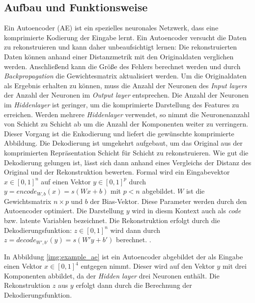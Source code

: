\subsection{Aufbau und Funktionsweise}

Ein Autoencoder (AE) ist ein spezielles neuronales Netzwerk, dass eine komprimierte Kodierung der Eingabe lernt. Ein Autoencoder versucht die Daten zu rekonstruieren und kann daher unbeaufsichtigt lernen: Die rekonstruierten Daten können anhand einer Distanzmetrik mit den Originaldaten verglichen werden. Anschließend kann die Größe des Fehlers berechnet werden und durch \textit{Backpropagation} die Gewichtesmatrix aktualisiert werden.
Um die Originaldaten als Ergebnis erhalten zu können, muss die Anzahl der Neuronen des \textit{Input layers} der Anzahl der Neuronen im \textit{Output layer} entsprechen. Die Anzahl der Neuronen im \textit{Hiddenlayer} ist geringer, um die komprimierte Darstellung des Features zu erreichen. Werden mehrere \textit{Hiddenlayer} verwendet, so nimmt die Neuronenanzahl von Schicht zu Schicht ab um die Anzahl der Komponenten weiter zu verringern. Dieser Vorgang ist die Enkodierung und liefert die gewünschte komprimierte Abbildung. Die Dekodierung ist umgekehrt aufgebaut, um das Original aus der komprimierten Repräsentation Schicht für Schicht zu rekonstruieren. Wie gut die Dekodierung gelungen ist, lässt sich dann anhand eines Vergleichs der Distanz des Original und der Rekonstruktion bewerten. Formal wird ein Eingabevektor $x \in [0,1]^n$ auf einen Vektor $y \in [0,1]^p$ durch $y = encode_{W,b}(x) = s(Wx + b)$  mit $p < n$ abgebildet. $W$ ist die Gewichtsmatrix $n \times p$ und $b$ der Bias-Vektor. Diese Parameter werden durch den Autoencoder optimiert. Die Darstellung $y$ wird in diesm Kontext auch als \textit{code} bzw. latente Variablen bezeichnet. Die Rekonstruktion erfolgt durch die Dekodierungsfunktion: $z \in [0, 1]^n$ wird dann durch $z = decode_{W', b'}(y) = s(W'y + b')$ berechnet. \cite{ssn1997}.

In Abbildung \ref{img:example_ae} ist ein Autoencoder abgebildet der als Eingabe einen Vektor $x \in [0,1]^4$ entgegen nimmt. Dieser wird auf den Vektor $y$ mit drei Komponenten abbildet, da der \textit{Hidden layer} drei Neuronen enthält. Die Rekonstruktion $z$ aus $y$ erfolgt dann durch die Berechnung der Dekodierungsfunktion.

